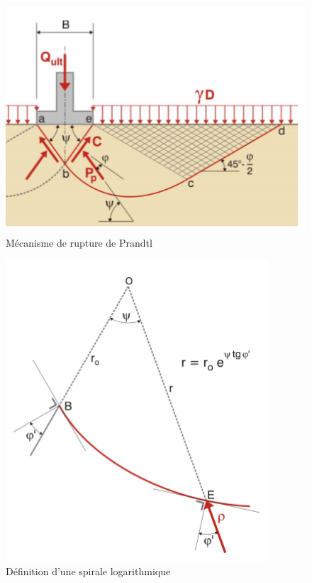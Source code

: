            \begin{multicols}{2}
            
                \begin{figure}[h!]
                \center
                \includegraphics[scale=0.8]{Holeyman/images/H21.PNG}
                \caption{Mécanisme de rupture de Prandtl }
                \end{figure}
            
            \vfill\null\columnbreak
            
                \begin{figure}[h!]
                \includegraphics[scale=0.6]{Holeyman/images/H22.PNG}
                \caption{Définition d’une spirale logarithmique }
                \end{figure}
                
            \end{multicols}
            
